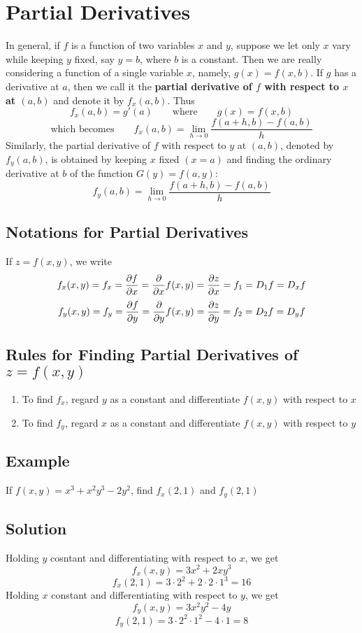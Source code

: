 \section{Partial Derivatives}
In general, if $f$ is a function of two variables $x$ and $y$, suppose we let only $x$
vary while keeping $y$ fixed, say $y = b$, where $b$ is a constant. Then we are really
considering a function of a single variable $x$, namely, $g(x) = f(x, b)$. If $g$ has
a derivative at $a$, then we call it the \textbf{partial derivative of $f$ with respect to $x$
    at $(a, b)$} and denote it by $f_x(a, b)$. Thus
$$f_x(a, b)=g'(a) \qquad \text{where} \qquad g(x) = f(x, b)$$
$$\text{which becomes} \qquad f_x(a,b)=\lim_{h\to 0}\frac{f(a+h,b)-f(a,b)}{h}$$
Similarly, the partial derivative of $f$ with respect to $y$ at $(a, b)$, denoted
by $f_y(a, b)$, is obtained by keeping $x$ fixed $(x = a)$ and finding the ordinary
derivative at $b$ of the function $G(y) = f(a, y)$:
$$f_y(a,b)=\lim_{h\to 0}\frac{f(a+h,b)-f(a,b)}{h}$$

\subsection*{Notations for Partial Derivatives}
If $z=f(x,y)$, we write
$$f_x(x,y)=f_x=\pdv{f}{x}=\frac{\partial}{\partial x}f(x,y)=\pdv{z}{x}=f_1=D_1f=D_xf$$
$$f_y(x,y)=f_y=\pdv{f}{y}=\frac{\partial}{\partial y}f(x,y)=\pdv{z}{y}=f_2=D_2f=D_yf$$

\subsection*{Rules for Finding Partial Derivatives of $z=f(x,y)$}
\begin{enumerate}
    \item To find $f_x$, regard $y$ as a constant and differentiate $f(x, y)$ with respect to $x$
    \item To find $f_y$, regard $x$ as a constant and differentiate $f(x, y)$ with respect to $y$
\end{enumerate}

\subsection*{Example}
If $f(x, y)  = x^3+x^2y^3-2y^2$, find $f_x(2, 1)$ and $f_y(2, 1)$

\subsection*{Solution}
Holding $y$ cosntant and differentiating with respect to $x$, we get
$$f_x(x,y)=3x^2+2xy^3$$
$$f_x(2,1)=3\cdot 2^2+2\cdot 2\cdot 1^3=16$$
Holding $x$ constant and differentiating with respect to $y$, we get
$$f_y(x,y)=3x^2y^2-4y$$
$$f_y(2,1)=3\cdot 2^2\cdot 1^2-4\cdot 1=8$$


